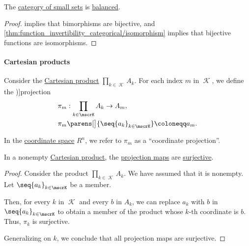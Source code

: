 \begin{corollary}\label{thm:category_of_sets_is_balanced}
  The \hyperref[def:category_of_small_sets]{category of small sets} is \hyperref[def:balanced_category]{balanced}.
\end{corollary}
\begin{proof}
   implies that bimorphisms are bijective, and \cref{thm:function_invertibility_categorical/isomorphism} implies that bijective functions are isomorphisms.
\end{proof}

\paragraph{Cartesian products}

\begin{definition}\label{def:cartesian_product_projection}
  Consider the \hyperref[def:cartesian_product]{Cartesian product} \( \prod_{k \in \mscrK} A_k \). For each index \( m \) in \( \mscrK \), we define the \term[ru=проекция (пары) (\cite[9]{Зорич2019АнализЧасть1})]{projection}
  \begin{equation*}
    \begin{aligned}
      &\pi_m: \prod_{k \in \mscrK} A_k \to A_m, \\
      &\pi_m\parens[\big]{ \seq{ a_k }_{k \in \mscrK} } \coloneqq a_m.
    \end{aligned}
  \end{equation*}
\end{definition}
\begin{comments}
  \item In the \hyperref[def:coordinate_space]{coordinate space} \( R^n \), we refer to \( \pi_m \) as a \enquote{coordinate projection}.
\end{comments}

\begin{proposition}\label{thm:cartesian_product_projection_surjective}
  In a nonempty \hyperref[def:cartesian_product]{Cartesian product}, the \hyperref[def:cartesian_product_projection]{projection maps} are \hyperref[def:function_invertibility/surjective]{surjective}.
\end{proposition}
\begin{proof}
  Consider the product \( \prod_{k \in \mscrK} A_k \). We have assumed that it is nonempty. Let \( \seq{ a_k }_{k \in \mscrK} \) be a member.

  Then, for every \( k \) in \( \mscrK \) and every \( b \) in \( A_k \), we can replace \( a_k \) with \( b \) in \( \seq{ a_k }_{k \in \mscrK} \) to obtain a member of the product whose \( k \)-th coordinate is \( b \). Thus, \( \pi_k \) is surjective.

  Generalizing on \( k \), we conclude that all projection maps are surjective.
\end{proof}

